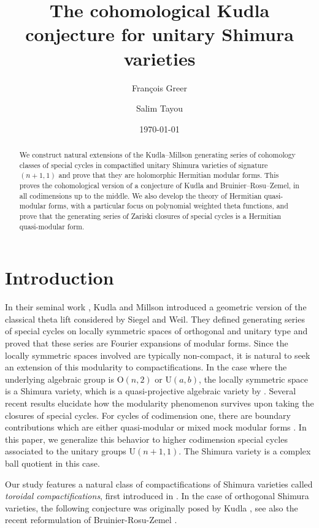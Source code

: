 \documentclass[11pt,letterpaper,english]{amsart}
\title[Cohomological Kudla conjecture]{The cohomological Kudla conjecture for unitary Shimura varieties}
\author{Fran\c{c}ois Greer}
\author{Salim Tayou}
\date{\today}
\numberwithin{equation}{subsection}
\numberwithin{equation}{section}
\theoremstyle{plain}
\theoremstyle{remark}
\begin{document}
\begin{abstract}
    We construct natural extensions of the Kudla--Millson generating series of cohomology classes of special cycles in compactified unitary Shimura varieties of signature $(n+1,1)$ and prove that they are holomorphic Hermitian modular forms. This proves the cohomological version of a conjecture of Kudla and Bruinier--Rosu--Zemel, in all codimensions up to the middle. We also develop the theory of Hermitian quasi-modular forms, with a particular focus on polynomial weighted theta functions, and prove that the generating series of Zariski closures of special cycles is a Hermitian quasi-modular form.
\end{abstract}

\maketitle
\setcounter{tocdepth}{1}
\tableofcontents






\section{Introduction}


In their seminal work \cite{kudla-millson}, Kudla and Millson introduced a geometric version of the classical theta lift considered by Siegel and Weil. They defined generating series of special cycles on locally symmetric spaces of orthogonal and unitary type and proved that these series are Fourier expansions of modular forms. Since the locally symmetric spaces involved are typically non-compact, it is natural to seek an extension of this modularity to compactifications. In the case where the underlying algebraic group is $\mathrm O(n,2)$ or $\mathrm U(a,b)$, the locally symmetric space is a Shimura variety, which is a quasi-projective algebraic variety by \cite{bailyborel}. Several recent results elucidate how the modularity phenomenon survives upon taking the closures of special cycles. For cycles of codimension one, there are boundary contributions which are either quasi-modular or mixed mock modular forms \cite{engel-greer-tayou}. In this paper, we generalize this behavior to higher codimension special cycles associated to the unitary groups $\mathrm U(n+1,1)$. The Shimura variety is a complex ball quotient in this case.


Our study features a natural class of compactifications of Shimura varieties called \emph{toroidal compactifications}, first introduced in \cite{amrt}. In the case of orthogonal Shimura varieties, the following conjecture was originally posed by Kudla \cite[Problem 3]{kudla_special_2004}, see also the recent reformulation of Bruinier-Rosu-Zemel \cite{bruinier-rosu-zemel}. 
\end{document}
